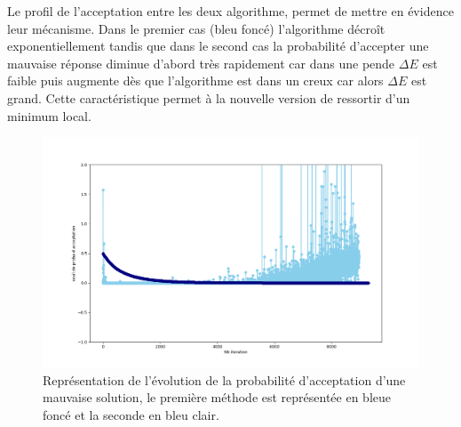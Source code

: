 \documentclass[12pt]{article}
\begin{document}
\begin{minipage}{0.5\textwidth}
Le profil de l'acceptation entre les deux algorithme, permet de mettre en évidence leur mécanisme. Dans le premier  cas (bleu foncé) l'algorithme décroît exponentiellement tandis que dans le second cas la probabilité d'accepter une mauvaise réponse diminue d'abord très rapidement car dans une pende $\Delta E$ est faible puis augmente dès que  l'algorithme est dans un creux car alors $\Delta E$ est grand. Cette caractéristique permet à la nouvelle version de ressortir d'un minimum local.
\end{minipage} \hfill
\begin{minipage}{0.45\textwidth}
\begin{figure}[H]
\includegraphics[width=1\textwidth]{PROBA_K.png}
\caption{Représentation de l'évolution de la probabilité d'acceptation d'une mauvaise solution, le première méthode est représentée en bleue foncé et la seconde en bleu clair. }
\label{Q2K}
\end{figure}
\end{minipage}


\end{document}
